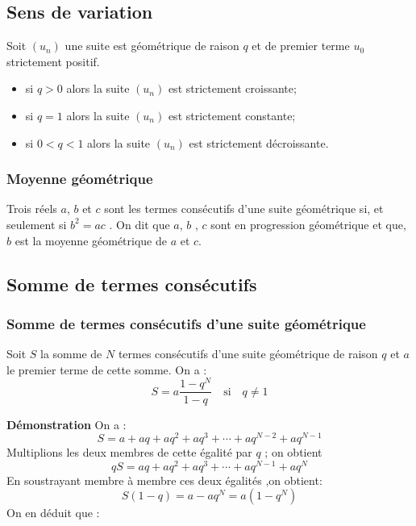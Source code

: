   \subsection*{Sens de variation}

\begin{theorem} 

Soit $(u_{n})$ une  suite est géométrique  de raison $ q $  et de premier terme $u_{0} $  strictement positif.
  \begin{itemize}
  \item si $ q>0 $ alors la suite  $(u_{n})$ est strictement croissante;
   \item si $ q=1 $ alors la suite  $(u_{n})$ est strictement constante;
    \item si $ 0<q<1 $ alors la suite  $(u_{n})$ est strictement décroissante.
  \end{itemize}
  \end{theorem}
   \subsubsection*{Moyenne géométrique}
  Trois réels $ a$, $ b$  et $ c$ sont les termes consécutifs d'une suite géométrique si, et seulement si $ b^{2}=ac $ . On dit que $ a$, $ b$ , $ c$ sont en progression géométrique et que, $ b$ est la moyenne géométrique de $ a $ et $ c$.
  \subsection*{Somme de termes consécutifs}
 \subsubsection*{Somme de termes consécutifs d'une suite géométrique}
 \begin{theorem}
  Soit $S$ la somme  de $ N $ termes consécutifs d'une  suite  géométrique  de raison $q $ et $ a $ le premier terme de cette somme. On a  : \[  S = a \dfrac{1-q^{N}}{1-q} \quad \text{si}\quad q\neq 1\]
  \end{theorem}
 
\textbf{Démonstration} On a :
  \[S= a+aq+ aq^{2}+ aq^{3}+ \cdots + aq^{N-2}+aq^{N-1}\]
  Multiplions les deux membres de cette égalité par $ q $ ; on obtient
   \[qS= aq+ aq^{2}+ aq^{3}+ \cdots + aq^{N-1}+aq^{N} \] 
   En soustrayant  membre à membre ces deux égalités ,on obtient:
   \[S(1-q)=a-aq^{N}=a(1-q^{N})\] On en déduit que :
   
